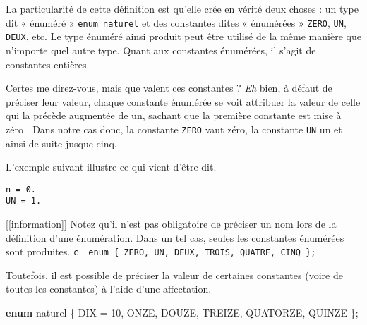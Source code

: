 \documentclass[]{article}
\newenvironment{Shaded}{}{}
\newcommand{\KeywordTok}[1]{\textcolor[rgb]{0.00,0.44,0.13}{\textbf{{#1}}}}
\newcommand{\DataTypeTok}[1]{\textcolor[rgb]{0.56,0.13,0.00}{{#1}}}
\newcommand{\DecValTok}[1]{\textcolor[rgb]{0.25,0.63,0.44}{{#1}}}
\newcommand{\SpecialCharTok}[1]{\textcolor[rgb]{0.25,0.44,0.63}{{#1}}}
\newcommand{\StringTok}[1]{\textcolor[rgb]{0.25,0.44,0.63}{{#1}}}
\newcommand{\ImportTok}[1]{{#1}}
\newcommand{\ControlFlowTok}[1]{\textcolor[rgb]{0.00,0.44,0.13}{\textbf{{#1}}}}
\newcommand{\PreprocessorTok}[1]{\textcolor[rgb]{0.74,0.48,0.00}{{#1}}}
\newcommand{\NormalTok}[1]{{#1}}
\begin{document}
La particularité de cette définition est qu'elle crée en vérité deux
choses : un type dit « énuméré » \texttt{enum\ naturel} et des
constantes dites « énumérées » \texttt{ZERO}, \texttt{UN},
\texttt{DEUX}, etc. Le type énuméré ainsi produit peut être utilisé de
la même manière que n'importe quel autre type. Quant aux constantes
énumérées, il s'agit de constantes entières.

Certes me direz-vous, mais que valent ces constantes ? \emph{Eh} bien, à
défaut de préciser leur valeur, chaque constante énumérée se voit
attribuer la valeur de celle qui la précède augmentée de un, sachant que
la première constante est mise à zéro . Dans notre cas donc, la
constante \texttt{ZERO} vaut zéro, la constante \texttt{UN} un et ainsi
de suite jusque cinq.

L'exemple suivant illustre ce qui vient d'être dit.

\begin{Shaded}
\end{Shaded}

\begin{verbatim}
n = 0.
UN = 1.
\end{verbatim}

{[}{[}information{]}{]} \textbar{} Notez qu'il n'est pas obligatoire de
préciser un nom lors de la définition d'une énumération. Dans un tel
cas, seules les constantes énumérées sont produites. \textbar{}
\textbar{}\texttt{c\ \textbar{}\ enum\ \{\ ZERO,\ UN,\ DEUX,\ TROIS,\ QUATRE,\ CINQ\ \};\ \textbar{}}

Toutefois, il est possible de préciser la valeur de certaines constantes
(voire de toutes les constantes) à l'aide d'une affectation.

\begin{Shaded}
\begin{Highlighting}[]
\KeywordTok{enum} \NormalTok{naturel \{ DIX = }\DecValTok{10}\NormalTok{, ONZE, DOUZE, TREIZE, QUATORZE, QUINZE \};}
\end{Highlighting}
\end{Shaded}
\end{document}
